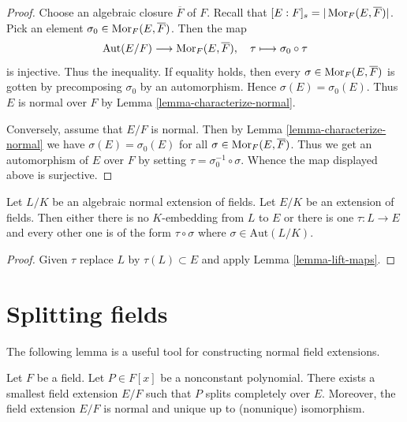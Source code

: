 \begin{proof}
Choose an algebraic closure $\overline{F}$ of $F$. Recall that
$[E : F]_s = |\mathop{\mathrm{Mor}}\nolimits_F(E, \overline{F})|$. Pick an element
$\sigma_0 \in \mathop{\mathrm{Mor}}\nolimits_F(E, \overline{F})$. Then the map
$$
\text{Aut}(E/F) \longrightarrow \mathop{\mathrm{Mor}}\nolimits_F(E, \overline{F}),\quad
\tau \longmapsto \sigma_0 \circ \tau
$$
is injective. Thus the inequality. If equality holds, then
every $\sigma \in \mathop{\mathrm{Mor}}\nolimits_F(E, \overline{F})$ is gotten by precomposing
$\sigma_0$ by an automorphism. Hence $\sigma(E) = \sigma_0(E)$.
Thus $E$ is normal over $F$ by Lemma \ref{lemma-characterize-normal}.

\medskip\noindent
Conversely, assume that $E/F$ is normal. Then by
Lemma \ref{lemma-characterize-normal} we have $\sigma(E) = \sigma_0(E)$
for all $\sigma \in \mathop{\mathrm{Mor}}\nolimits_F(E, \overline{F})$.
Thus we get an automorphism of $E$ over $F$ by setting
$\tau = \sigma_0^{-1} \circ \sigma$. Whence the map displayed above
is surjective.
\end{proof}

\begin{lemma}
\label{lemma-normal-embeddings-differ-by-aut}
Let $L/K$ be an algebraic normal extension of fields.
Let $E/K$ be an extension of fields. Then either
there is no $K$-embedding from $L$ to $E$ or
there is one $\tau : L \to E$ and every other
one is of the form $\tau \circ \sigma$ where $\sigma \in \text{Aut}(L/K)$.
\end{lemma}

\begin{proof}
Given $\tau$ replace $L$ by $\tau(L) \subset E$ and apply
Lemma \ref{lemma-lift-maps}.
\end{proof}





\section{Splitting fields}
\label{section-splitting-fieds}

\noindent
The following lemma is a useful tool for constructing normal field extensions.

\begin{lemma}
\label{lemma-splitting-field}
Let $F$ be a field. Let $P \in F[x]$ be a nonconstant polynomial.
There exists a smallest field extension $E/F$ such that $P$
splits completely over $E$. Moreover, the field extension $E/F$ is normal
and unique up to (nonunique) isomorphism.
\end{lemma}

